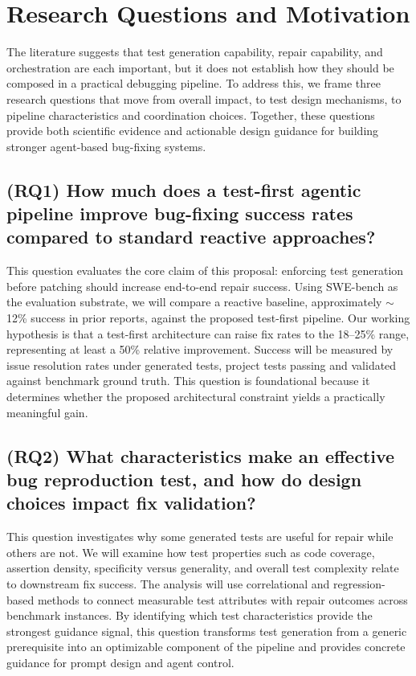 \documentclass[12pt]{article}
\begin{document}

\section{Research Questions and Motivation}

The literature suggests that test generation capability, repair capability, and orchestration are each important, but it does not establish how they should be composed in a practical debugging pipeline. To address this, we frame three research questions that move from overall impact, to test design mechanisms, to pipeline characteristics and coordination choices. Together, these questions provide both scientific evidence and actionable design guidance for building stronger agent-based bug-fixing systems.

\subsection{(RQ1) How much does a test-first agentic pipeline improve bug-fixing success rates compared to standard reactive approaches?}

This question evaluates the core claim of this proposal: enforcing test generation before patching should increase end-to-end repair success. Using SWE-bench as the evaluation substrate, we will compare a reactive baseline, approximately $\sim$12\% success in prior reports, against the proposed test-first pipeline. Our working hypothesis is that a test-first architecture can raise fix rates to the 18--25\% range, representing at least a 50\% relative improvement. Success will be measured by issue resolution rates under generated tests, project tests passing and validated against benchmark ground truth. This question is foundational because it determines whether the proposed architectural constraint yields a practically meaningful gain.

\subsection{(RQ2) What characteristics make an effective bug reproduction test, and how do design choices impact fix validation?}

This question investigates why some generated tests are useful for repair while others are not. We will examine how test properties such as code coverage, assertion density, specificity versus generality, and overall test complexity relate to downstream fix success. The analysis will use correlational and regression-based methods to connect measurable test attributes with repair outcomes across benchmark instances. By identifying which test characteristics provide the strongest guidance signal, this question transforms test generation from a generic prerequisite into an optimizable component of the pipeline and provides concrete guidance for prompt design and agent control.
\end{document}
